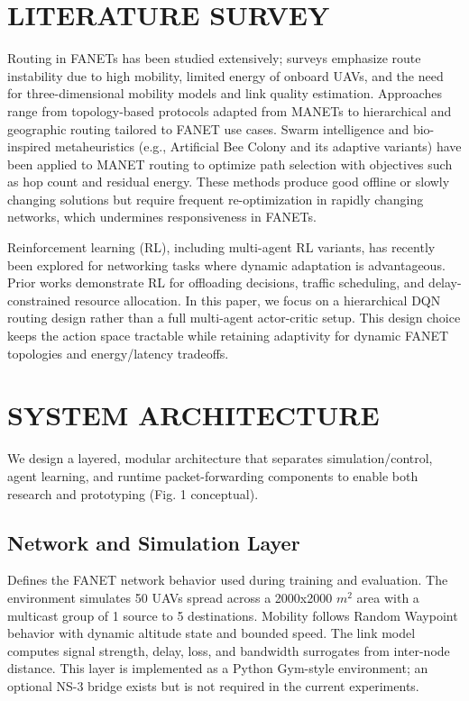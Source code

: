 \documentclass[conference]{IEEEtran}
\begin{document}
\section{LITERATURE SURVEY}
Routing in FANETs has been studied extensively; surveys emphasize route instability due to high mobility, limited energy of onboard UAVs, and the need for three-dimensional mobility models and link quality estimation. Approaches range from topology-based protocols adapted from MANETs to hierarchical and geographic routing tailored to FANET use cases. Swarm intelligence and bio-inspired metaheuristics (e.g., Artificial Bee Colony and its adaptive variants) have been applied to MANET routing to optimize path selection with objectives such as hop count and residual energy. These methods produce good offline or slowly changing solutions but require frequent re-optimization in rapidly changing networks, which undermines responsiveness in FANETs.

Reinforcement learning (RL), including multi-agent RL variants, has recently been explored for networking tasks where dynamic adaptation is advantageous. Prior works demonstrate RL for offloading decisions, traffic scheduling, and delay-constrained resource allocation. In this paper, we focus on a hierarchical DQN routing design rather than a full multi-agent actor-critic setup. This design choice keeps the action space tractable while retaining adaptivity for dynamic FANET topologies and energy/latency tradeoffs.

\section{SYSTEM ARCHITECTURE}
We design a layered, modular architecture that separates simulation/control, agent learning, and runtime packet-forwarding components to enable both research and prototyping (Fig. 1 conceptual).

\subsection{Network and Simulation Layer}
Defines the FANET network behavior used during training and evaluation. The environment simulates 50 UAVs spread across a 2000x2000 $m^2$ area with a multicast group of 1 source to 5 destinations. Mobility follows Random Waypoint behavior with dynamic altitude state and bounded speed. The link model computes signal strength, delay, loss, and bandwidth surrogates from inter-node distance. This layer is implemented as a Python Gym-style environment; an optional NS-3 bridge exists but is not required in the current experiments.
\end{document}
